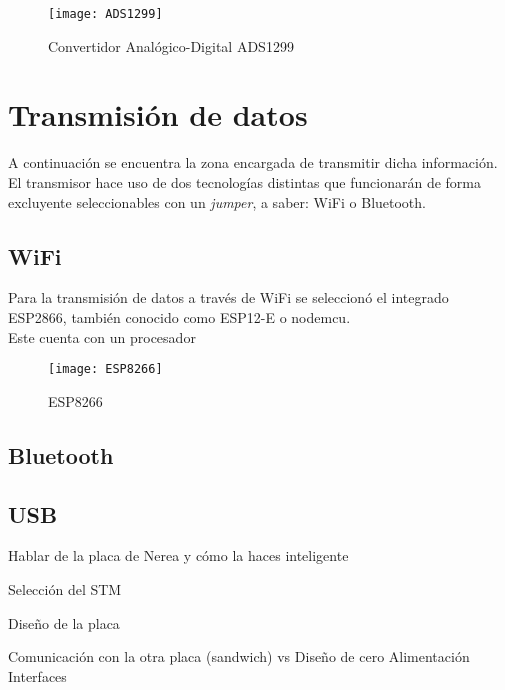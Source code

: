 \begin{figure} [H]
    \centering
    \texttt{[image: ADS1299]}
    \caption{Convertidor Analógico-Digital ADS1299}
    \label{fig:ADS1299}
\end{figure}

\section{Transmisión de datos\label{sec:Transmisión_N}}

A continuación se encuentra la zona encargada de transmitir dicha información.
\\El transmisor hace uso de dos tecnologías distintas que funcionarán de forma excluyente seleccionables con un \textit{jumper}, a saber: WiFi o Bluetooth.

\subsection{WiFi\label{sec:WiFi_N}}

Para la transmisión de datos a través de WiFi se seleccionó el integrado ESP2866, también conocido como ESP12-E o nodemcu.
\\Este cuenta con un procesador 

\begin{figure} [H]
    \centering
    \texttt{[image: ESP8266]}
    \caption{ESP8266}
    \label{fig:ESP8266}
\end{figure}

\subsection{Bluetooth\label{sec:Bluetooth_N}}



\subsection{USB\label{sec:USB_N}}


Hablar de la placa de Nerea y cómo la haces inteligente

Selección del STM

Diseño de la placa

	Comunicación con la otra placa (sandwich) vs Diseño de cero
	Alimentación
	Interfaces
